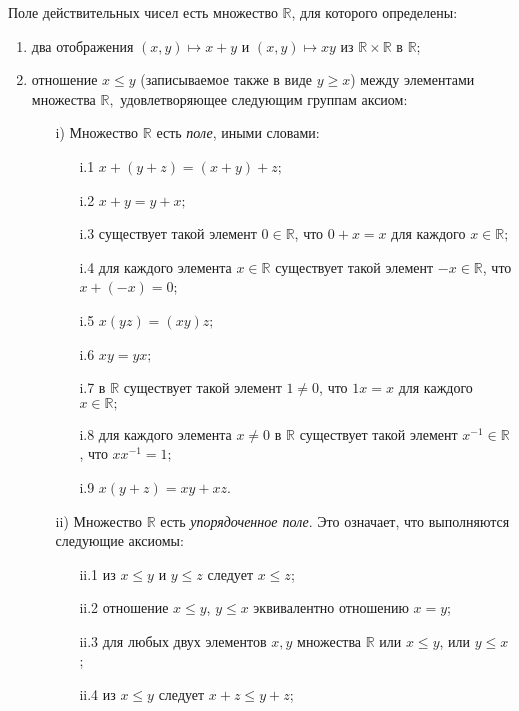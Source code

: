 \begin{definition}\label{field}
 Поле действительных чисел есть множество $\mathbb{R}$, для которого определены:
\begin{enumerate}
    \item два отображения $(x,y)\mapsto x+y$ и $(x,y) \mapsto xy$ из $\mathbb{R}\times \mathbb{R}$ в $\mathbb{R}$;
    \item отношение $x \le y$ (записываемое также в виде $y \ge  x$) между элементами множества $\mathbb{R},$ удовлетворяющее следующим группам аксиом:
     \begin{itemize}
         \item[i)] Множество $\mathbb{R}$ есть \textit{поле}, иными словами:
         \begin{itemize}
             \item[i.1] $x+ (y+z) = (x+y)+z;$
             \item[i.2] $x+y = y+x;$
             \item[i.3] существует такой элемент $0 \in \mathbb{R}$, что $0+x= x$ для каждого $x \in \mathbb{R};$
             \item[i.4] для каждого элемента $x\in \mathbb{R}$ существует такой элемент $-x \in \mathbb{R}$, что $x+(-x) = 0$;
             \item[i.5] $x(yz) = (xy)z;$
             \item [i.6] $xy = yx;$
             \item[i.7] в $\mathbb{R}$ существует такой элемент $1 \ne 0$, что $1 x = x$ для каждого $x\in \mathbb{R};$
             \item[i.8] для каждого элемента $x \ne 0$ в $\mathbb{R}$ существует такой элемент $x^{-1} \in \mathbb{R}$, что $xx^{-1} = 1;$
             \item[i.9] $x(y+z) = xy + xz$.
         \end{itemize}
         \item[ii)] Множество $\mathbb{R}$ есть \textit{упорядоченное поле}. Это означает, что выполняются следующие аксиомы:
          \begin{itemize}
              \item [ii.1] из $x\le y$ и $y\le z$ следует $x\le z$;
              \item [ii.2] отношение $x\le y$, $y\le x$ эквивалентно отношению $x = y$;
              \item[ii.3] для любых двух элементов $x,y$ множества $\mathbb{R}$ или $x\le y$, или $y \le x$;
              \item[ii.4] из $x \le y$ следует $x+z \le y+z$;

\end{itemize}
\end{itemize}
\end{enumerate}
\end{definition}
